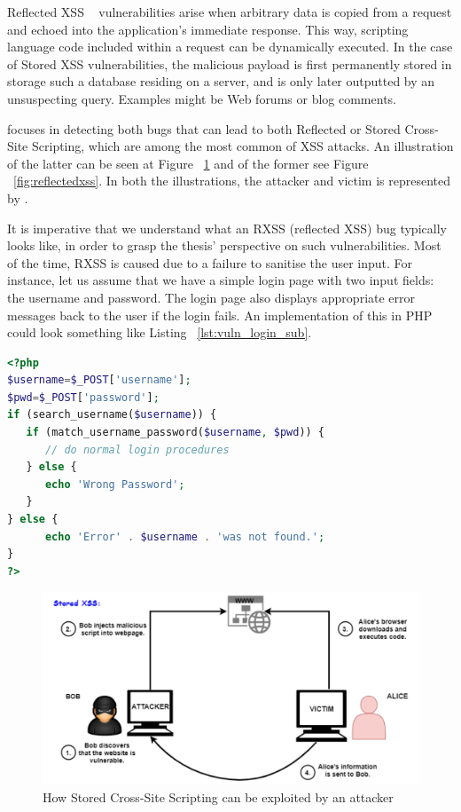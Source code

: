 Reflected XSS ~\cite{rxss_def} vulnerabilities arise when arbitrary data is copied from a request and echoed into the application's immediate response. This way, scripting language code included within a request can be dynamically executed.
In the case of Stored XSS vulnerabilities, the malicious payload is first permanently stored in storage such a database residing on a server, and is only later outputted by an unsuspecting query. Examples might be Web forums or blog comments. 

\pname{} focuses in detecting both bugs that can lead to both Reflected or Stored Cross-Site Scripting, which are among the most common of XSS attacks. An illustration of the latter can be seen at Figure ~\ref{fig:storedxss} and of the former see Figure ~\ref{fig:reflectedxss}. In both the illustrations, the attacker and victim is represented by \pname{}.

It is imperative that we understand what an RXSS (reflected XSS) bug typically looks like, in order to grasp the thesis' perspective on such vulnerabilities. Most of the time, RXSS is caused due to a failure to sanitise the user input. For instance, let us assume that we have a simple login page with two input fields: the username and password. The login page also displays appropriate error messages back to the user if the login fails. An implementation of this in PHP could look something like Listing ~\ref{lst:vuln_login_sub}.

\begin{lstlisting}[language=PHP, caption={Vulnerable login form.}, numbersep=5pt, label={lst:vuln_login_sub}]
<?php
$username=$_POST['username'];
$pwd=$_POST['password'];
if (search_username($username)) {
   if (match_username_password($username, $pwd)) {
      // do normal login procedures
   } else {
      echo 'Wrong Password';
   }
} else {
      echo 'Error' . $username . 'was not found.';
}
?>
\end{lstlisting}

\begin{figure}[ht]
 \centering
 \captionsetup{justification=centering}
 \includegraphics[width=\linewidth]{figures/storedxss.pdf}
 \caption{How Stored Cross-Site Scripting can be exploited by an attacker}
 \label{fig:storedxss}
\end{figure}

